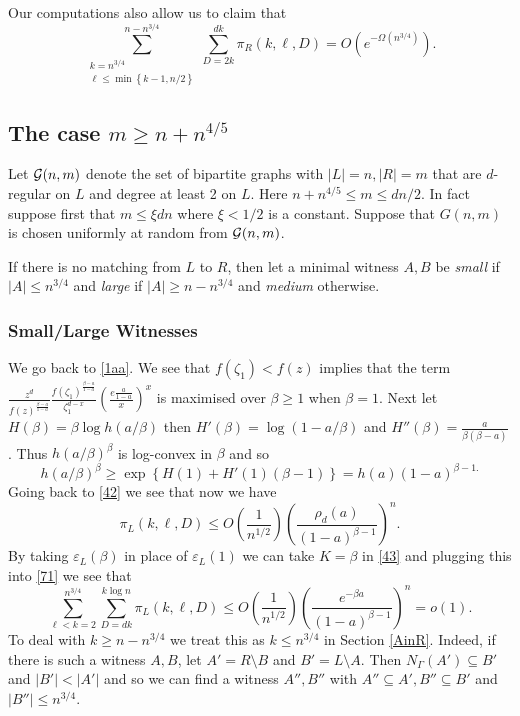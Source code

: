 \documentclass[11pt]{article}
\def\b{\beta}
\def\e{\varepsilon}
\def\G{\Gamma}
\def\z{\zeta}
\def\p{\pi}
\def\r{\rho}
\newcommand{\set}[1]{\left\{#1\right\}}
\def\cG{{\cal G}}
\newcommand{\brac}[1]{\left(#1\right)}
\newcommand{\bfrac}[2]{\brac{\frac{#1}{#2}}}
\newcommand{\beq}[1]{\begin{equation}\label{#1}}
\newcommand{\eeq}{\end{equation}}
\def\c{{3/4}}
\begin{document}
Our computations also allow us to claim that
\beq{next1}
\sum_{\substack{k=n^\c\\ \ell\leq\min\set{k-1,n/2}}}^{n-n^\c}\sum_{D=2k}^{dk}\p_R(k,\ell,D)=O(e^{-\Omega(n^\c)}).
\eeq

\subsection{The case $m\geq n+n^{4/5}$}\label{gre}
Let $\cG(n,m)$ denote the set of bipartite graphs with $|L|=n,|R|=m$ that are $d$-regular on $L$ and 
degree at least 2 on $L$. Here $n+n^{4/5}\leq m\leq dn/2$. In fact suppose first that $m\leq \xi dn$ where $\xi<1/2$ is a constant.
Suppose that $G(n,m)$ is chosen uniformly at random from $\cG(n,m)$.

If there is no matching from $L$ to $R$, then let a minimal witness $A,B$ be {\em small} if $|A|\leq n^{3/4}$ 
and {\em large} if $|A|\geq n-n^{3/4}$ and {\em medium} otherwise. 
\subsubsection{Small/Large Witnesses}\label{smallw}
We go back to \eqref{1aa}. We see that $f(\z_1)<f(z)$ implies that the term 
$\frac{z^d}{f(z)^{\frac{\b-a}{1-a}}}\frac{f(\z_1)^{\frac{\b-a}{1-a}}}{\z_1^{d-x}}
\bfrac{e\frac{a}{1-a}}{x}^x$ is maximised over $\b\geq 1$ when $\b=1$. Next let $H(\b)=\b\log h(a/\b)$ then $H'(\b)=\log(1-a/\b)$ and 
$H''(\b)=\frac{a}{\b(\b-a)}$. Thus $h(a/\b)^\b$ is log-convex in $\b$ and so 
\beq{hab}
h(a/\b)^\b\geq \exp\set{H(1)+H'(1)(\b-1)}=h(a)(1-a)^{\b-1.}
\eeq
Going back to \eqref{42} we see that now we have
\beq{71}
\p_L(k,\ell,D)\leq O\bfrac{1}{n^{1/2}}\bfrac{\r_d(a)}{(1-a)^{\b-1}}^n.
\eeq
By taking $\e_L(\b)$ in place of $\e_L(1)$ we can take $K=\b$ in \eqref{43} and plugging this into \eqref{71}
we see that
\beq{noo5}
\sum_{\ell<k=2}^{n^\c}\sum_{D=dk}^{k\log n}\p_L(k,\ell,D)\leq O\bfrac{1}{n^{1/2}}\bfrac{e^{-\b a}}{(1-a)^{\b-1}}^n=o(1).
\eeq
To deal with $k\geq n-n^{\c}$ we treat this as $k\leq n^{\c}$ in Section \ref{AinR}. Indeed, if there is such 
a witness $A,B$, let $A'=R\setminus B$ and $B'=L\setminus A$. Then $N_\G(A')\subseteq B'$ and $|B'|<|A'|$ and so we can 
find a witness $A'',B''$ with $A''\subseteq A',B''\subseteq B'$ and $|B''|\leq n^\c$.
\end{document}
